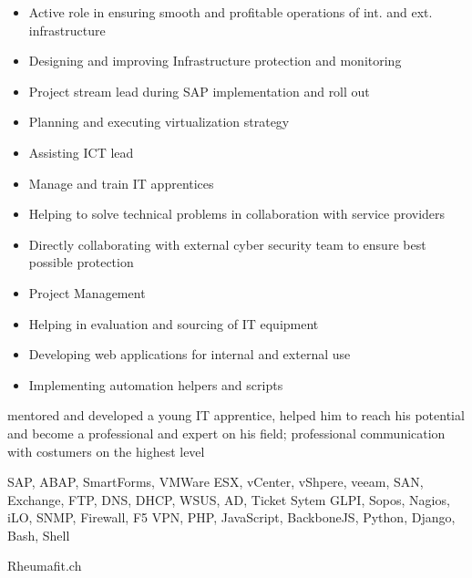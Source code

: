 \documentclass[9pt,a4paper]{altacv}
\begin{document}
\divider

%

\begin{itemize}
\item Active role in ensuring smooth and profitable operations of int. and ext. infrastructure
\item Designing and improving Infrastructure protection and monitoring
\item Project stream lead during SAP implementation and roll out
\item Planning and executing virtualization strategy
\item Assisting ICT lead
\item Manage and train IT apprentices
\item Helping to solve technical problems in collaboration with service providers
\item Directly collaborating with external cyber security team to ensure best possible protection
\item Project Management
\item Helping in evaluation and sourcing of IT equipment
\item Developing web applications for internal and external use
\item Implementing automation helpers and scripts

\end{itemize}

mentored and developed a young IT apprentice, helped him to reach his potential and become a professional and expert on his field;
professional communication with costumers on the highest level

SAP, ABAP, SmartForms,
VMWare ESX, vCenter, vShpere, veeam, SAN,
Exchange, FTP, DNS, DHCP, WSUS, AD, Ticket Sytem GLPI,
Sopos, Nagios, iLO, SNMP, Firewall, F5 VPN,
PHP, JavaScript, BackboneJS, Python, Django, Bash, Shell



%
\makebox[0pt][l]{%
  \hspace{-5cm}
  \raisebox{-\totalheight}[0pt][0pt]{%
   {\color{background}\fontsize{250}{48}\faHeart}
}}%
{\color{emphasis}Rheumafit.ch\par}
\smallskip
{\small{}}%
{\small{}}\par
\smallskip
\end{document}
